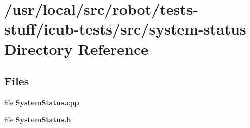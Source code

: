 \section{/usr/local/src/robot/tests-\/stuff/icub-\/tests/src/system-\/status Directory Reference}
\label{dir_0cd6c076357e074f55f9c4922f92a746}
\subsection*{Files}
\begin{DoxyCompactItemize}
\item 
file {\bfseries System\-Status.\-cpp}
\item 
file {\bfseries System\-Status.\-h}
\end{DoxyCompactItemize}
